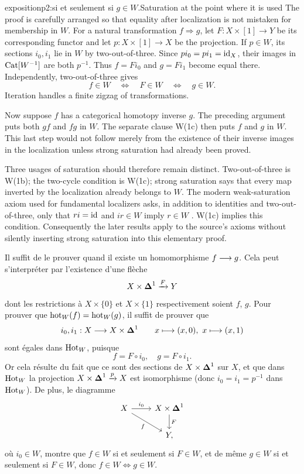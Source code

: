 \begin{dcomment}{exposition}{p2:si et seulement si $g \in W$.}{Saturation at the point where it is used}
The proof is carefully arranged so that equality after localization is not mistaken for membership in \(W\). For a natural transformation \(f\Rightarrow g\), let \(F:X\times[1]\to Y\) be its corresponding functor and let \(p:X\times[1]\to X\) be the projection. If \(p\in W\), its sections \(i_0,i_1\) lie in \(W\) by two-out-of-three. Since \(pi_0=pi_1=\mathrm{id}_X\), their images in \(\mathrm{Cat}[W^{-1}]\) are both \(p^{-1}\). Thus \(f=Fi_0\) and \(g=Fi_1\) become equal there. Independently, two-out-of-three gives
\[
 f\in W\quad\Longleftrightarrow\quad F\in W
 \quad\Longleftrightarrow\quad g\in W.
\]
Iteration handles a finite zigzag of transformations.

Now suppose \(f\) has a categorical homotopy inverse \(g\). The preceding argument puts both \(gf\) and \(fg\) in \(W\). The separate clause W(1c) then puts \(f\) and \(g\) in \(W\). This last step would not follow merely from the existence of their inverse images in the localization unless strong saturation had already been proved.

Three usages of saturation should therefore remain distinct. Two-out-of-three is W(1b); the two-cycle condition is W(1c); strong saturation says that every map inverted by the localization already belongs to \(W\). The modern weak-saturation axiom used for fundamental localizers asks, in addition to identities and two-out-of-three, only that \(ri=\mathrm{id}\) and \(ir\in W\) imply \(r\in W\) \citep[Definition~1.1.1]{Cisinski2004Minimal}. W(1c) implies this condition. Consequently the later results apply to the source's axioms without silently inserting strong saturation into this elementary proof.
\end{dcomment}


Il suffit de le prouver quand il existe un homomorphisme $f \longrightarrow g$. Cela peut s'interpréter par l'existence d'une flèche
\[ X \times \boldsymbol{\Delta}^1 \xrightarrow{F} Y \]
dont les restrictions à $X \times \{0\}$ et $X \times \{1\}$ respectivement soient $f$, $g$. Pour prouver que $\mathrm{hot}_W(f) = \mathrm{hot}_W(g)$, il suffit de prouver que
\[ i_0, i_1 : X \longrightarrow X \times \boldsymbol{\Delta}^1 \qquad x \longmapsto (x,0),\ x \longmapsto (x,1) \]
sont égales dans $\mathrm{Hot}_W$, puisque
\[ f = F \circ i_0, \quad g = F \circ i_1. \]
Or cela résulte du fait que ce sont des sections de $X \times \boldsymbol{\Delta}^1$ sur $X$, et que dans $\mathrm{Hot}_W$ la projection $X \times \boldsymbol{\Delta}^1 \xrightarrow{p} X$ est isomorphisme (donc $i_0 = i_1 = p^{-1}$ dans $\mathrm{Hot}_W$). De plus, le diagramme
\[
\begin{tikzcd}
X \arrow[r, "i_0"] \arrow[dr, "f"'] & X \times \Dl^1 \arrow[d, "F"] \\
& Y,
\end{tikzcd}
\]
où $i_0 \in W$, montre que $f \in W$ si et seulement si $F \in W$, et de même $g \in W$ si et seulement si $F \in W$, donc $f \in W \Longleftrightarrow g \in W$.


